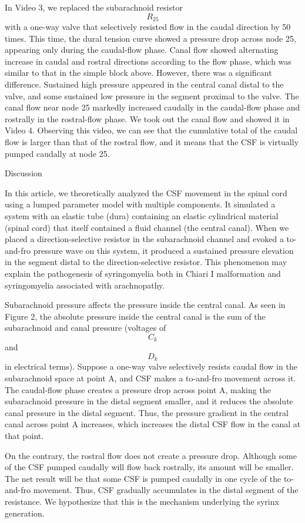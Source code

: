 \documentclass[a4paper,12pt]{article}
\begin{document}
In Video 3, we replaced the subarachnoid resistor \[R_{25}\] with a one-way valve that selectively resisted flow in the caudal direction by 50 times. This time, the dural tension curve showed a pressure drop across node 25, appearing only during the caudal-flow phase. Canal flow showed alternating increase in caudal and rostral directions according to the flow phase, which was similar to that in the simple block above. However, there was a significant difference. Sustained high pressure appeared in the central canal distal to the valve, and some sustained low pressure in the segment proximal to the valve. The canal flow near node 25 markedly increased caudally in the caudal-flow phase and rostrally in the rostral-flow phase. We took out the canal flow and showed it in Video 4. Observing this video, we can see that the cumulative total of the caudal flow is larger than that of the rostral flow, and it means that the CSF is virtually pumped caudally at node 25.

Discussion

In this article, we theoretically analyzed the CSF movement in the spinal cord using a lumped parameter model with multiple components. It simulated a system with an elastic tube (dura) containing an elastic cylindrical material (spinal cord) that itself contained a fluid channel (the central canal). When we placed a direction-selective resistor in the subarachnoid channel and evoked a to-and-fro pressure wave on this system, it produced a sustained pressure elevation in the segment distal to the direction-selective resistor. This phenomenon may explain the pathogenesis of syringomyelia both in Chiari I malformation and syringomyelia associated with arachnopathy.

Subarachnoid pressure affects the pressure inside the central canal. As seen in Figure 2, the absolute pressure inside the central canal is the sum of the subarachnoid and canal pressure (voltages of \[C_k\] and \[D_k\] in electrical terms). Suppose a one-way valve selectively resists caudal flow in the subarachnoid space at point A, and CSF makes a to-and-fro movement across it. The caudal-flow phase creates a pressure drop across point A, making the subarachnoid pressure in the distal segment smaller, and it reduces the absolute canal pressure in the distal segment. Thus, the pressure gradient in the central canal across point A increases, which increases the distal CSF flow in the canal at that point.

On the contrary, the rostral flow does not create a pressure drop. Although some of the CSF pumped caudally will flow back rostrally, its amount will be smaller. The net result will be that some CSF is pumped caudally in one cycle of the to-and-fro movement. Thus, CSF gradually accumulates in the distal segment of the resistance. We hypothesize that this is the mechanism underlying the syrinx generation.
\end{document}
